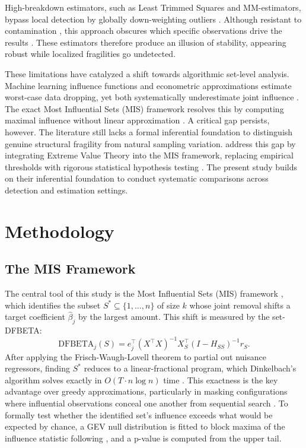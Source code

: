\documentclass[12pt]{article}
\begin{document}
High-breakdown estimators, such as Least Trimmed Squares and MM-estimators, bypass local detection by globally down-weighting outliers \parencite{rousseeuw2003robust, yohai1987high}. Although resistant to contamination \parencite{huber2009robust}, this approach obscures which specific observations drive the results \parencite{pena1995detection, riani2014monitoring}. These estimators therefore produce an illusion of stability, appearing robust while localized fragilities go undetected.  

These limitations have catalyzed a shift towards algorithmic set-level analysis. Machine learning influence functions \parencite{koh2017understanding, huang2025approximations} and econometric approximations \parencite{broderick2020automatic} estimate worst-case data dropping, yet both systematically underestimate joint influence \parencite{koh2019accuracy, basu2020second}. The exact Most Influential Sets (MIS) framework resolves this by computing maximal influence without linear approximation \parencite{kuschnig2021hidden}. A critical gap persists, however. The literature still lacks a formal inferential foundation to distinguish genuine structural fragility from natural sampling variation. \textcite{konrad2026testing} address this gap by integrating Extreme Value Theory into the MIS framework, replacing empirical thresholds with rigorous statistical hypothesis testing \parencite{coles2001introduction}. The present study builds on their inferential foundation to conduct systematic comparisons across detection and estimation settings.

\section{Methodology}

\subsection{The MIS Framework}

The central tool of this study is the Most Influential Sets (MIS)
framework \parencite{kuschnig2021hidden}, which identifies the subset
$S^* \subseteq \{1,\ldots,n\}$ of size $k$ whose joint removal shifts
a target coefficient $\hat{\beta}_j$ by the largest amount. This shift
is measured by the set-DFBETA:
\[
\mathrm{DFBETA}_j(S) = e_j^\top(X^\top X)^{-1}
X_S^\top(I - H_{SS})^{-1}r_S.
\]
After applying the Frisch-Waugh-Lovell theorem to partial out nuisance regressors, finding $S^*$ reduces to a linear-fractional program, which Dinkelbach's algorithm solves exactly in $O(T \cdot n\log n)$ time \parencite{kuschnig2026finding}. This exactness is the key advantage over greedy approximations, particularly in masking configurations where influential observations conceal one another from sequential search \parencite{hadi1993procedures}. To formally test whether the identified set's influence exceeds what would be expected by chance, a GEV null distribution is fitted to block maxima of the influence statistic following \textcite{konrad2026testing}, and a p-value is computed from the upper tail.
\end{document}
